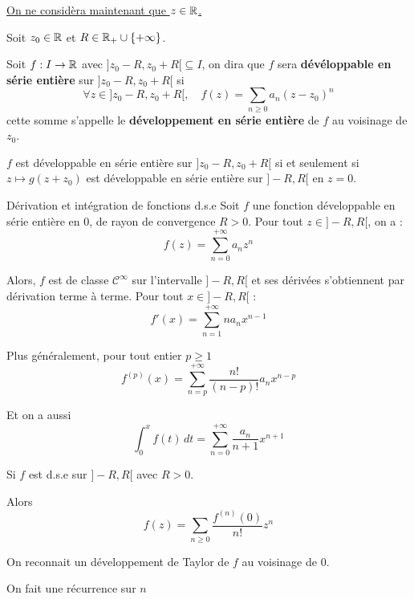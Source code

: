 \documentclass[a4paper, 12pt]{article}
\begin{document}
\underline{On ne considèra maintenant que $z \in \mathbb{R}$.}

\begin{definition}
    Soit $z_0 \in \mathbb{R}$ et $R \in \mathbb{R}_+ \cup \{+\infty\}$.

    Soit $f: I \to \mathbb{R}$ avec $]z_0 - R, z_0 + R[ \subseteq I$, on dira que $f$ sera \textbf{dévéloppable en série entière} sur $]z_0 - R, z_0 + R[$ si
    $$
    \forall z \in ]z_0 - R, z_0 + R[, \quad f(z) = \sum_{n \geq 0} a_n (z - z_0)^n
    $$
    cette somme s'appelle le \textbf{développement en série entière} de $f$ au voisinage de $z_0$.
\end{definition}

\begin{proposition}{}{}
    $f$ est développable en série entière sur $]z_0 - R, z_0 + R[$ si et seulement si
    $z \mapsto g(z + z_0)$ est développable en série entière sur $]-R, R[$ en $z = 0$.
\end{proposition}

\begin{theoreme}{Dérivation et intégration de fonctions d.s.e}{}
    Soit $f$ une fonction développable en série entière en 0, de rayon de convergence $R > 0$. 
    Pour tout $z \in ]-R, R[$, on a : 
    $$
    f(z) = \sum_{n=0}^{+\infty} a_n z^n
    $$

    Alors, $f$ est de classe $\mathcal{C}^\infty$ sur l'intervalle $]-R, R[$ et ses dérivées s'obtiennent par dérivation terme à terme. Pour tout $x \in ]-R, R[$ :
    $$
    f'(x) = \sum_{n=1}^{+\infty} n a_n x^{n-1}
    $$

    Plus généralement, pour tout entier $p \geq 1$
    $$
    f^{(p)}(x) = \sum_{n=p}^{+\infty} \frac{n!}{(n-p)!} a_n x^{n-p}
    $$

    Et on a aussi
    $$
    \int_0^x f(t) \,dt = \sum_{n=0}^{+\infty} \frac{a_n}{n + 1} x^{n + 1}
    $$
\end{theoreme}

\begin{corollaire}{}{}
    Si $f$ est d.s.e sur $]-R, R[$ avec $R > 0$.

    Alors
    $$
    f(z) = \sum_{n \geq 0} \dfrac{f^{(n)}(0)}{n!} z^n
    $$
\end{corollaire}

\begin{remarque}
    On reconnait un développement de Taylor de $f$ au voisinage de 0.
\end{remarque}

\begin{demonstration}
    On fait une récurrence sur $n$
\end{demonstration}
\end{document}
